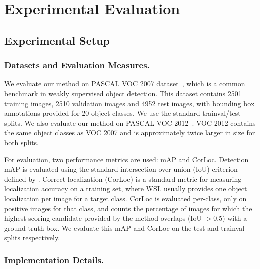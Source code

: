 \documentclass[runningheads]{llncs}
\begin{document}
\section{Experimental Evaluation}
\subsection{Experimental Setup}\subsubsection{Datasets and Evaluation Measures.}

We evaluate our method on PASCAL VOC 2007 dataset~\cite{Everingham10}, which is
a common benchmark in weakly supervised object detection. This dataset contains
2501 training images, 2510 validation images and 4952 test images, with
bounding box annotations provided for 20 object classes. We use the standard
trainval/test splits. 
We also evaluate our method on PASCAL VOC 2012~\cite{pascal-voc-2012}. VOC 2012 contains the same 
object classes as VOC 2007 and is approximately twice larger in size for both splits.

For evaluation, two performance metrics are used: mAP and CorLoc. 
Detection mAP is evaluated using the standard
intersection-over-union (IoU) criterion defined by \cite{Everingham10}.
Correct localization (CorLoc) \cite{Deselaers:2012ci} is a standard metric 
for measuring localization accuracy on a training set, 
where WSL usually provides one object localization per image for a target class.  
CorLoc is evaluated per-class, only on positive images for
that class, and counts the percentage of images for which the highest-scoring
candidate provided by the method overlaps (IoU $> 0.5$) with a ground truth box.
We evaluate this mAP and CorLoc on the test and trainval splits respectively. 

\subsubsection{Implementation Details.}
\end{document}
